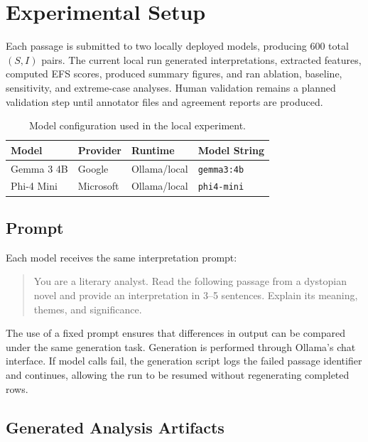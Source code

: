 \documentclass[10pt, conference]{IEEEtran}
\begin{document}
\section{Experimental Setup} \label{sec:setup}

Each passage is submitted to two locally deployed models, producing 600 total $(S,I)$ pairs. The current local run generated interpretations, extracted features, computed EFS scores, produced summary figures, and ran ablation, baseline, sensitivity, and extreme-case analyses. Human validation remains a planned validation step until annotator files and agreement reports are produced.

\begin{table}[h]
\centering
\caption{Model configuration used in the local experiment.}
\label{tab:model_config}
\scriptsize
\begin{tabular}{llll}
\toprule
\textbf{Model} & \textbf{Provider} & \textbf{Runtime} & \textbf{Model String} \\
\midrule
Gemma 3 4B & Google & Ollama/local & \texttt{gemma3:4b} \\
Phi-4 Mini & Microsoft & Ollama/local & \texttt{phi4-mini} \\
\bottomrule
\end{tabular}
\end{table}

\subsection{Prompt}

Each model receives the same interpretation prompt:

\begin{quote}
You are a literary analyst. Read the following passage from a dystopian novel and provide an interpretation in 3--5 sentences. Explain its meaning, themes, and significance.
\end{quote}

The use of a fixed prompt ensures that differences in output can be compared under the same generation task. Generation is performed through Ollama's chat interface. If model calls fail, the generation script logs the failed passage identifier and continues, allowing the run to be resumed without regenerating completed rows.

\subsection{Generated Analysis Artifacts}
\end{document}
